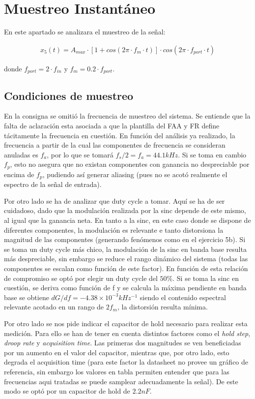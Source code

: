 \section{Muestreo Instantáneo}
En este apartado se analizara el muestreo de la señal:

\begin{align*}
    x_5(t) = A_{max} \cdot [1+cos(2\pi \cdot f_m \cdot t)] \cdot cos(2\pi \cdot f_{port}\cdot t)
\end{align*}

\noindent donde $f_{port} = 2 \cdot f_{in}$ y $f_m = 0.2 \cdot f_{port} $. 

\subsection{Condiciones de muestreo}
En la consigna se omitió la frecuencia de muestreo del sistema. Se entiende que la falta de aclaración esta asociada a que la plantilla del FAA y FR define tácitamente la frecuencia en cuestión. En función del análisis ya realizado, la frecuencia a partir de la cual las componentes de frecuencia se consideran anuladas es $f_a$, por lo que se tomará $f_s / 2 = f_a = 44.1kHz$. Si se toma en cambio $f_p$, esto no asegura que no existan componentes con ganancia no despreciable por encima de $f_p$, pudiendo así generar aliasing (pues no se acotó realmente el espectro de la señal de entrada).

Por otro lado se ha de analizar que duty cycle  a tomar. Aquí se ha de ser cuidadoso, dado que la modulación realizada por la sinc depende de este mismo, al igual que la ganancia neta. En tanto a la sinc, en este caso donde se dispone de diferentes componentes, la modulación es relevante e tanto distorsiona la magnitud de las componentes (generando fenómenos como en el ejercicio 5b). Si se toma un duty cycle más chico, la modulación de la sinc en banda base resulta más despreciable, sin embargo se reduce el rango dinámico del sistema (todas las componentes se escalan como función de este factor). En función de esta relación de compromiso se optó por elegir un duty cycle del $50\%$. Si se toma la sinc en cuestión, se deriva como función de f y se calcula la máxima pendiente en banda base se obtiene $dG/df = -4.38\times 10^{-3} kHz^{-1}$ siendo el contenido espectral relevante acotado en un rango de $2f_m$, la distorsión resulta mínima. 


Por otro lado se nos pide indicar el capacitor de hold necesario para realizar esta medición. Para ello se han de tener en cuenta distintos factores como el \emph{hold step}, \emph{droop rate} y \emph{acquisition time}. Las primeras dos magnitudes se ven beneficiadas por un aumento en el valor del capacitor, mientras que, por otro lado, esto degrada el acquisition time (para este factor la datasheet no provee un gráfico de referencia, sin embargo los valores en tabla permiten entender que para las frecuencias aqui tratadas se puede samplear adecuadamente la señal). De este modo se optó por un capacitor de hold de $2.2nF$.

